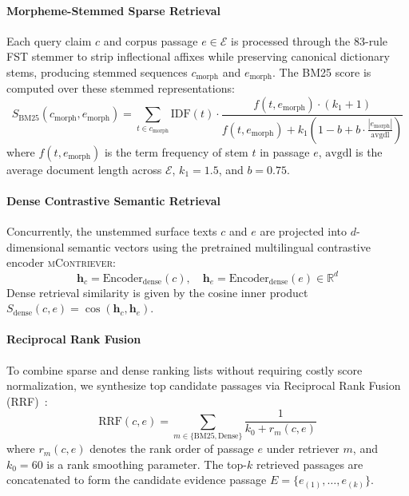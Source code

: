 \paragraph{Morpheme-Stemmed Sparse Retrieval}
Each query claim $c$ and corpus passage $e \in \mathcal{E}$ is processed through the 83-rule FST stemmer to strip inflectional affixes while preserving canonical dictionary stems, producing stemmed sequences $c_{\text{morph}}$ and $e_{\text{morph}}$. The BM25 score is computed over these stemmed representations:
\begin{equation}
\label{eq:bm25_formula}
S_{\text{BM25}}(c_{\text{morph}}, e_{\text{morph}}) = \sum_{t \in c_{\text{morph}}} \mathrm{IDF}(t) \cdot \frac{f(t, e_{\text{morph}}) \cdot (k_1 + 1)}{f(t, e_{\text{morph}}) + k_1 \left(1 - b + b \cdot \frac{|e_{\text{morph}}|}{\mathrm{avgdl}}\right)}
\end{equation}
where $f(t, e_{\text{morph}})$ is the term frequency of stem $t$ in passage $e$, $\mathrm{avgdl}$ is the average document length across $\mathcal{E}$, $k_1 = 1.5$, and $b = 0.75$.

\paragraph{Dense Contrastive Semantic Retrieval}
Concurrently, the unstemmed surface texts $c$ and $e$ are projected into $d$-dimensional semantic vectors using the pretrained multilingual contrastive encoder \textsc{mContriever}:
\begin{equation}
\label{eq:dense_retrieval}
\mathbf{h}_c = \mathrm{Encoder}_{\text{dense}}(c), \quad \mathbf{h}_e = \mathrm{Encoder}_{\text{dense}}(e) \in \mathbb{R}^d
\end{equation}
Dense retrieval similarity is given by the cosine inner product $S_{\text{dense}}(c, e) = \cos(\mathbf{h}_c, \mathbf{h}_e)$.

\paragraph{Reciprocal Rank Fusion}
To combine sparse and dense ranking lists without requiring costly score normalization, we synthesize top candidate passages via Reciprocal Rank Fusion (RRF)~\citep{karpukhin2020dpr}:
\begin{equation}
\label{eq:rrf_fusion}
\mathrm{RRF}(c, e) = \sum_{m \in \{\text{BM25}, \text{Dense}\}} \frac{1}{k_0 + r_m(c, e)}
\end{equation}
where $r_m(c, e)$ denotes the rank order of passage $e$ under retriever $m$, and $k_0 = 60$ is a rank smoothing parameter. The top-$k$ retrieved passages are concatenated to form the candidate evidence passage $E = \{e_{(1)}, \dots, e_{(k)}\}$.

